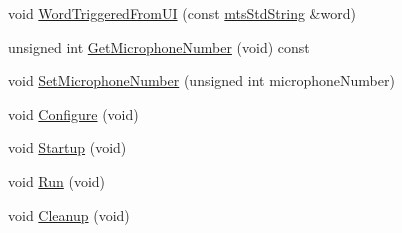 \begin{DoxyCompactItemize}
\item 
void \hyperlink{classmts_c_m_u_sphinx4_a2900018c5fe6c5225c6d57ab10ec8d22}{Word\-Triggered\-From\-U\-I} (const \hyperlink{mts_generic_object_proxy_8h_adbc21bfbf98367e582bf8a263b7e711f}{mts\-Std\-String} \&word)
\item 
unsigned int \hyperlink{classmts_c_m_u_sphinx4_a9488e4f47742ce5b1b48d055e6def874}{Get\-Microphone\-Number} (void) const 
\item 
void \hyperlink{classmts_c_m_u_sphinx4_acf56f1bf512345020c8ed15639d79ade}{Set\-Microphone\-Number} (unsigned int microphone\-Number)
\item 
void \hyperlink{classmts_c_m_u_sphinx4_afaeafdc63e9389742e8a1f46d3ac0432}{Configure} (void)
\item 
void \hyperlink{classmts_c_m_u_sphinx4_aa8a33191783d7bc871cb592d0a92d66a}{Startup} (void)
\item 
void \hyperlink{classmts_c_m_u_sphinx4_aaa675bedc415146f13f5e532aa76f5ef}{Run} (void)
\item 
void \hyperlink{classmts_c_m_u_sphinx4_a657b3005af0ef03bf268c0a795aef869}{Cleanup} (void)
\end{DoxyCompactItemize}
